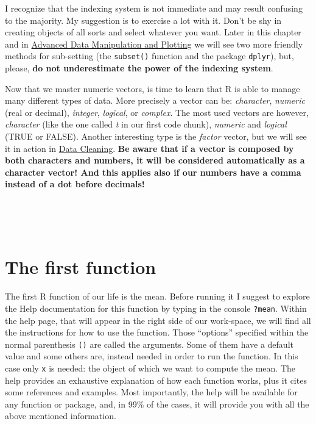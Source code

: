 \documentclass[
]{svmono}
\begin{document}
I recognize that the indexing system is not immediate and may result
confusing to the majority. My suggestion is to exercise a lot with it.
Don't be shy in creating objects of all sorts and select whatever you
want. Later in this chapter and in \protect\hyperlink{advanced-data-manipulation-and-plotting}{Advanced Data Manipulation and
Plotting} we will see two more friendly methods for sub-setting (the
\texttt{subset()} function and the package \texttt{dplyr}), but, please, \textbf{do not
underestimate the power of the indexing system}.

Now that we master numeric vectors, is time to learn that R is able to
manage many different types of data. More precisely a vector can be:
\emph{character}, \emph{numeric} (real or decimal), \emph{integer}, \emph{logical}, or
\emph{complex}. The most used vectors are however, \emph{character} (like the one
called \emph{t} in our first code chunk), \emph{numeric} and \emph{logical} (TRUE or
FALSE). Another interesting type is the \emph{factor} vector, but we will see
it in action in \protect\hyperlink{data-cleaning}{Data Cleaning}. \textbf{Be aware that if a vector is composed
by both characters and numbers, it will be considered automatically as a
character vector! And this applies also if our numbers have a comma
instead of a dot before decimals!}

~

~
~

\hypertarget{the-first-function}{%
\section{The first function}\label{the-first-function}}

The first R function of our life is the mean. Before running it I
suggest to explore the Help documentation for this function by typing in
the console \texttt{?mean}. Within the help page, that will appear in the right
side of our work-space, we will find all the instructions for how to use
the function. Those ``options'' specified within the normal parenthesis
\texttt{()} are called the arguments. Some of them have a default value and
some others are, instead needed in order to run the function. In this
case only \texttt{x} is needed: the object of which we want to compute the
mean. The help provides an exhaustive explanation of how each function
works, plus it cites some references and examples. Most importantly, the
help will be available for any function or package, and, in 99\% of the
cases, it will provide you with all the above mentioned information.
\end{document}
